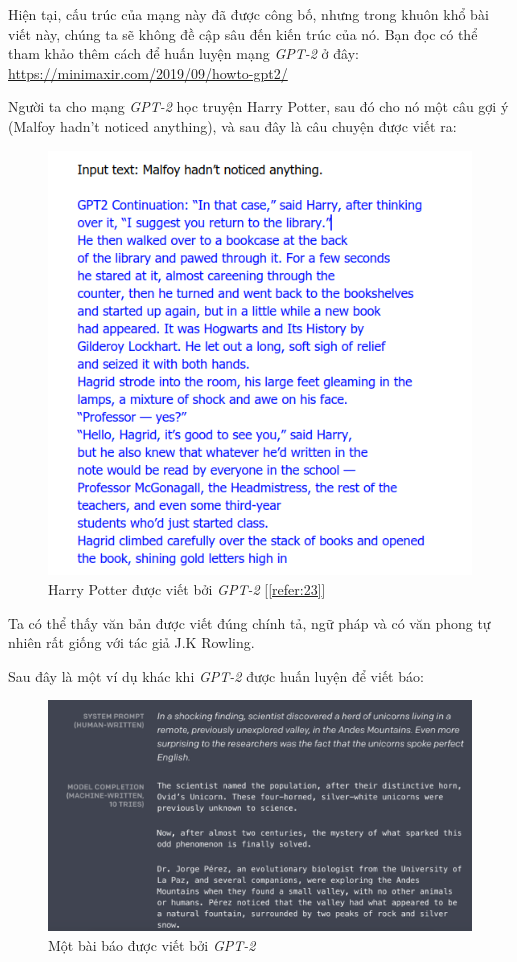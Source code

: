 Hiện tại, cấu trúc của mạng này đã được công bố, nhưng trong khuôn khổ bài viết này, chúng ta sẽ không đề cập sâu đến kiến trúc của nó. Bạn đọc có thể tham khảo thêm cách để huấn luyện mạng \textit{GPT-2} ở đây: \url{https://minimaxir.com/2019/09/howto-gpt2/}

Người ta cho mạng \textit{GPT-2} học truyện Harry Potter, sau đó cho nó một câu gợi ý (Malfoy hadn't noticed anything), và sau đây là câu chuyện được viết ra:

\begin{figure}[h!]
	\centering
		\includegraphics[width=0.7\columnwidth]{books/artificial-neural-network/chapter07/figure-sec3/gpt-2-harrypotter.png}
		\centering
	\caption{Harry Potter được viết bởi \textit{GPT-2} [\ref{refer:23}]}
\end{figure}

Ta có thể thấy văn bản được viết đúng chính tả, ngữ pháp và có văn phong tự nhiên rất giống với tác giả J.K Rowling.

Sau đây là một ví dụ khác khi \textit{GPT-2} được huấn luyện để viết báo:

\begin{figure}[h!]
	\centering
		\includegraphics[width=1\columnwidth]{books/artificial-neural-network/chapter07/figure-sec3/gpt-2-papers.png}
		\centering
	\caption{Một bài báo được viết bởi \textit{GPT-2}}
\end{figure}

